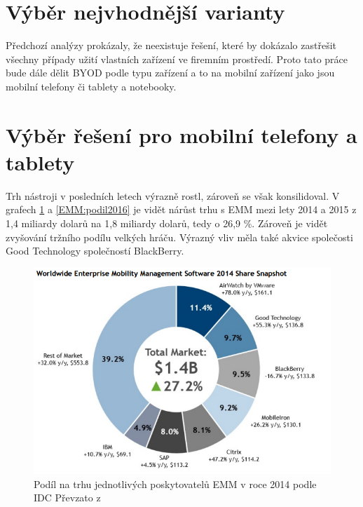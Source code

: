 \section{Výběr nejvhodnější varianty}

Předchozí analýzy prokázaly, že neexistuje řešení, které by dokázalo zastřešit všechny případy užití vlastních zařízení ve firemním prostředí. Proto tato práce bude dále dělit BYOD podle typu zařízení a to na mobilní zařízení jako jsou mobilní telefony či tablety a notebooky.

\section{Výběr řešení pro mobilní telefony a tablety}


Trh nástroji v posledních letech výrazně rostl, zároveň se však konsilidoval.  V grafech \ref{EMM:podil2015} a \ref{EMM:podil2016} je vidět nárůst trhu s EMM mezi lety 2014 a 2015 z 1,4 miliardy dolarů na 1,8 miliardy dolarů, tedy o 26,9 \%. Zároveň je vidět zvyšování tržního podílu velkých hráču. Výrazný vliv měla také akvice společosti Good Technology společností BlackBerry.

 
  \begin{figure}[h]
\includegraphics[width=13cm]{img/IDC_EMM}
\caption{Podíl na trhu jednotlivých poskytovatelů EMM v roce 2014 podle IDC Převzato z \cite{}} 
\label{EMM:podil2015}
\centering
\end{figure}

